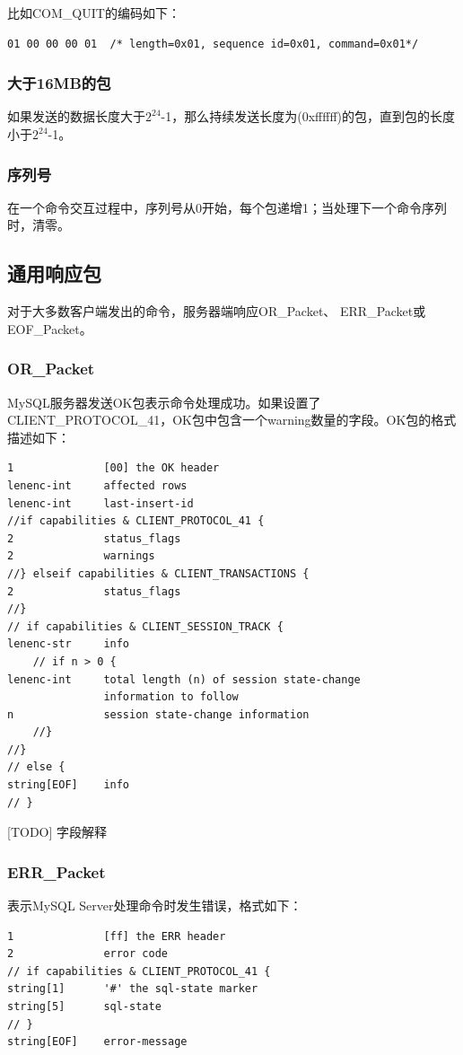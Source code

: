 \documentclass[a4paper, titlepage, 10pt, bookmark]{article}
\begin{document}
比如COM\_QUIT的编码如下：
\begin{spacing}{1.0}
\begin{lstlisting}
01 00 00 00 01  /* length=0x01, sequence id=0x01, command=0x01*/
\end{lstlisting}
\end{spacing}

\subsubsection{大于16MB的包}
如果发送的数据长度大于$2^{24}$-1，那么持续发送长度为(0xffffff)的包，直到包的长度小于$2^{24}$-1。

\subsubsection{序列号}
在一个命令交互过程中，序列号从0开始，每个包递增1；当处理下一个命令序列时，清零。



\subsection{通用响应包}
对于大多数客户端发出的命令，服务器端响应OR\_Packet、 ERR\_Packet或EOF\_Packet。

\subsubsection{OR\_Packet}
MySQL服务器发送OK包表示命令处理成功。如果设置了CLIENT\_PROTOCOL\_41，OK包中包含一个warning数量的字段。OK包的格式描述如下：
\begin{spacing}{1.0}
\begin{lstlisting}
1              [00] the OK header
lenenc-int     affected rows
lenenc-int     last-insert-id
//if capabilities & CLIENT_PROTOCOL_41 {
2              status_flags
2              warnings
//} elseif capabilities & CLIENT_TRANSACTIONS {
2              status_flags
//}
// if capabilities & CLIENT_SESSION_TRACK {
lenenc-str     info
    // if n > 0 {
lenenc-int     total length (n) of session state-change
               information to follow
n              session state-change information
    //}
//}
// else {
string[EOF]    info
// }
\end{lstlisting}
\end{spacing}

[TODO] 字段解释

\subsubsection{ERR\_Packet}
表示MySQL Server处理命令时发生错误，格式如下：
\begin{spacing}{1.0}
\begin{lstlisting}
1              [ff] the ERR header
2              error code
// if capabilities & CLIENT_PROTOCOL_41 {
string[1]      '#' the sql-state marker
string[5]      sql-state
// }
string[EOF]    error-message
\end{lstlisting}
\end{spacing}
\end{document}
